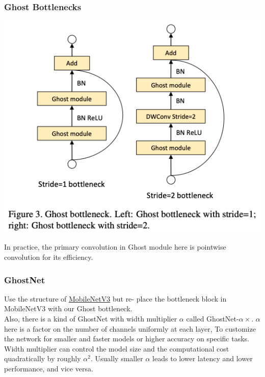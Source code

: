 \documentclass[12pt]{article}
\begin{document}
            \subsubsection{
                Ghost Bottlenecks
            }   
                \begin{center}
                    \includegraphics[scale=0.6]{src/img/Ghost bottleneck.jpg} \\
                \end{center}
                In practice, the primary convolution in Ghost module here is pointwise convolution for its efficiency. \\

            \subsubsection{
                GhostNet
            }
                Use the structure of \href{https://arxiv.org/pdf/1905.02244.pdf}{MobileNetV3} but re- place the bottleneck block in MobileNetV3 with our Ghost bottleneck. \\ 
                Also, there is a kind of GhostNet with width multiplier $ \alpha $ called GhostNet-$\alpha \times$. $\alpha$ here is a factor on the number of channels uniformly at each layer, To customize
                the network for smaller and faster models or higher accuracy on specific tasks. \\
                Width multiplier can control the model size and the computational cost quadratically by roughly $ \alpha^2 $. Usually smaller $\alpha$ leads to lower latency and lower performance, and vice versa. \\
        
\end{document}

